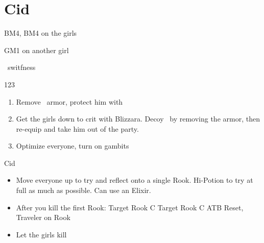 \chapter{Cid}


\begin{liscense}
	BM4, BM4 on the girls

	GM1 on another girl

	\vaan\ switfness
\end{liscense}
\begin{gambit}
	\begin{itemize}
	\end{itemize}
\end{gambit}
\begin{shop}{123}
	\buy{Aeroga}
\end{shop}
\begin{enumerate}
	\item Remove \vaan\ armor, protect him with \penelo
	\item Get the girls down to crit with Blizzara. Decoy \vaan\ by removing the armor, then re-equip and take him out of the party.
	\item Optimize everyone, turn on gambits
\end{enumerate}
\begin{battle}{Cid}
	\begin{itemize}
		\item Move everyone up to try and reflect onto a single Rook.
		      \vaanf Hi-Potion to try at full as much as possible. Can use an Elixir.
		\item After you kill the first Rook:
		      \ashef Target Rook C
		      \penelof Target Rook C
		      \vaanf ATB Reset, Traveler on Rook
		\item Let the girls kill
	\end{itemize}
\end{battle}